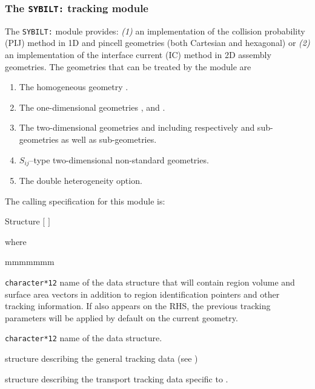 \subsubsection{The {\tt SYBILT:} tracking module}\label{sect:SYBILData}

The {\tt SYBILT:} module provides: {\sl (1)} an implementation of the collision probability (PIJ) method in 1D and pincell geometries (both Cartesian and hexagonal)
or {\sl (2)} an implementation of the interface current (IC) method in 2D assembly geometries. The geometries that can be treated by the module  are

\begin{enumerate}

\item The homogeneous geometry .

\item The one-dimensional geometries ,  and .\cite{ALCOL}

\item The two-dimensional geometries  and  including
respectively  and  sub-geometries as well as 
sub-geometries. 

\item $S_{ij}$--type two-dimensional non-standard geometries.\cite{Apollo}

\item The double heterogeneity option.\cite{BIHET}

\end{enumerate}

The calling specification for this module is:

\begin{DataStructure}{Structure }
\moc{:=}  $[$  $]$
 \moc{::}  
\end{DataStructure}

\noindent  where
\begin{ListeDeDescription}{mmmmmmm}

\item[\dusa{TRKNAM}] {\tt character*12} name of the  data
structure that will contain region volume and surface area vectors in
addition to region identification pointers and other tracking information.
If  also appears on the RHS, the previous tracking 
parameters will be applied by default on the current geometry.

\item[\dusa{GEONAM}] {\tt character*12} name of the  data
structure.

\item[\dstr{desctrack}] structure describing the general tracking data (see
)

\item[\dstr{descsybil}] structure describing the transport tracking data
specific to .

\end{ListeDeDescription}


